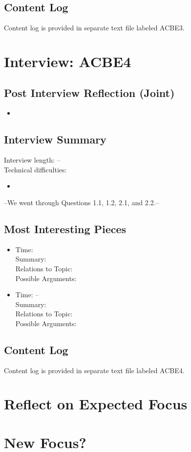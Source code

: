 \documentclass{article}
\begin{document}
\subsection{Content Log}
Content log is provided in separate text file labeled ACBE3.

\newpage
\section{Interview: ACBE4}
\subsection{Post Interview Reflection (Joint)}
\begin{itemize}
  \item 
\end{itemize}
\subsection{Interview Summary}
Interview length: -- \\
Technical difficulties:
\begin{itemize}
  \item 
\end{itemize}
--We went through Questions 1.1, 1.2, 2.1, and 2.2.--
\subsection{Most Interesting Pieces}
\begin{itemize}
  \item Time: \\
  Summary:  \\
  Relations to Topic: \\
  Possible Arguments: 
  \item Time: --\\
  Summary: \\
  Relations to Topic:  \\
  Possible Arguments: 
\end{itemize}

\subsection{Content Log}
Content log is provided in separate text file labeled ACBE4.

\newpage
\section{Reflect on Expected Focus}
\section{New Focus?}
\end{document}

